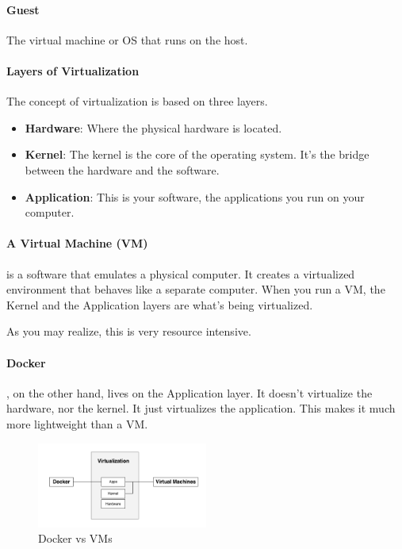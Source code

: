 \documentclass[a4paper]{article}
\begin{document}
    \paragraph{Guest} The virtual machine or OS that runs on the host.
    

    \paragraph{Layers of Virtualization} The concept of virtualization is based on three layers.
    \begin{itemize}
        \item \textbf{Hardware}: Where the physical hardware is located. 
        \item \textbf{Kernel}: The kernel is the core of the operating system. It's the bridge between the hardware and the software.
        \item \textbf{Application}: This is your software, the applications you run on your computer.
    \end{itemize}

    \paragraph{A Virtual Machine (VM)} is a software that emulates a physical computer. It creates a virtualized environment that behaves like a separate computer. When you run a VM, the Kernel and the Application layers are what's being virtualized.

    As you may realize, this is very resource intensive.

    \paragraph*{Docker}, on the other hand, lives on the Application layer. It doesn't virtualize the hardware, nor the kernel. It just virtualizes the application. This makes it much more lightweight than a VM.


    \begin{figure}[h]
        \centering
        \includegraphics[width=0.5\textwidth]{img/docker-vs-vms.png}
        \caption{Docker vs VMs}
        \label{fig:my_label}
    \end{figure}
\end{document}
